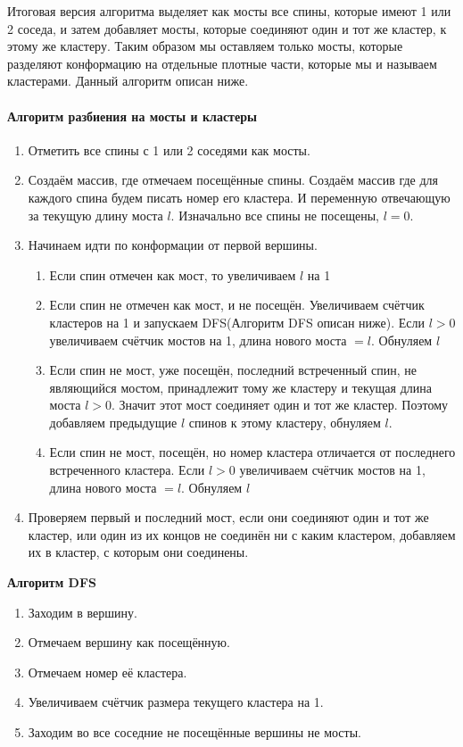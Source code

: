 Итоговая версия алгоритма выделяет как мосты все спины, которые имеют 1 или 2 соседа, и затем добавляет мосты, которые соединяют один и тот же кластер, к этому же кластеру. Таким образом мы оставляем только мосты, которые разделяют конформацию на отдельные плотные части, которые мы и называем кластерами. Данный алгоритм описан ниже.

\paragraph{Алгоритм разбиения на мосты и кластеры}
\begin{enumerate}
	\item Отметить все спины с 1 или 2 соседями как мосты.
	\item Создаём массив, где отмечаем посещённые спины. Создаём массив где для каждого спина будем писать номер его кластера. И переменную отвечающую за текущую длину моста $l$. Изначально все спины не посещены, $l = 0$.
	\item Начинаем идти по конформации от первой вершины.
	\begin{enumerate}
	
		\item Если спин отмечен как мост, то увеличиваем $l$ на 1
		\item Если спин не отмечен как мост, и не посещён. Увеличиваем счётчик кластеров на 1 и запускаем DFS(Алгоритм DFS описан ниже). Если $l > 0$ увеличиваем счётчик мостов на 1, длина нового моста $= l$. Обнуляем $l$
		\item Если спин не мост, уже посещён, последний встреченный спин, не являющийся мостом, принадлежит тому же кластеру и текущая длина моста $l > 0$. Значит этот мост соединяет один и тот же кластер. Поэтому добавляем предыдущие $l$ спинов к этому кластеру, обнуляем $l$.
		\item Если спин не мост, посещён, но номер кластера отличается от последнего встреченного кластера. Если $l > 0$ увеличиваем счётчик мостов на 1, длина нового моста $= l$. Обнуляем $l$
	\end{enumerate}
	\item Проверяем первый и последний мост, если они соединяют один и тот же кластер, или один из их концов не соединён ни с каким кластером, добавляем их в кластер, с которым они соединены.
\end{enumerate}

\textbf{Алгоритм DFS}
\begin{enumerate}
	\item Заходим в вершину.
	\item Отмечаем вершину как посещённую.
	\item Отмечаем номер её кластера.
	\item Увеличиваем счётчик размера текущего кластера на 1.
	\item Заходим во все соседние не посещённые вершины не мосты.
\end{enumerate}

